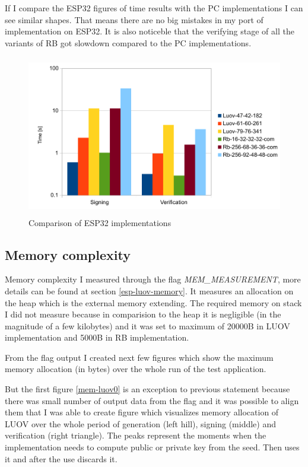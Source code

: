 \documentclass[thesis=M,english]{FITthesis}[2019/12/23]
\begin{document}
\bigskip
\noindent
If I compare the ESP32 figures of time results with the PC implementations I can see similar shapes. That means there are no big mistakes in my port of implementation on ESP32. It is also noticeble that the verifying stage of all the variants of RB got slowdown compared to the PC implementations.

\begin{figure}[H]
\centering
\includegraphics[width=13cm,height=7cm]{images/time-both.pdf}
\caption{Comparison of ESP32 implementations}
\label{time-both}
\end{figure}

\subsection{Memory complexity}
Memory complexity I measured through the flag \textit{MEM\_MEASUREMENT}, more details can be found at section \ref{esp-luov-memory}. It measures an allocation on the heap which is the external memory extending. The required memory on stack I did not measure because in comparision to the heap it is negligible (in the magnitude of a few kilobytes) and it was set to maximum of 20000B in LUOV implementation and 5000B in RB implementation.

\bigskip
\noindent
From the flag output I created next few figures which show the maximum memory allocation (in bytes) over the whole run of the test application.

\bigskip
\noindent
But the first figure \ref{mem-luov0} is an exception to previous statement because there was small number of output data from the flag and it was possible to align them that I was able to create figure which visualizes memory allocation of LUOV over the whole period of generation (left hill), signing (middle) and verification (right triangle). The peaks represent the moments when the implementation needs to compute public or private key from the seed. Then uses it and after the use discards it.
\end{document}

